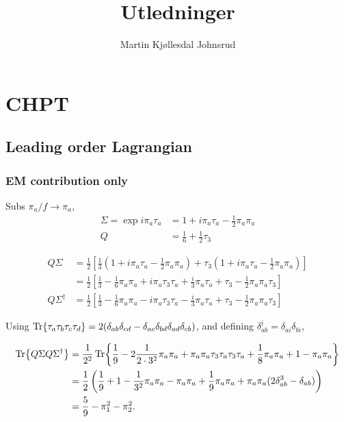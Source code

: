 \documentclass{book}
\title{\huge{Utledninger}}
\author{
    \large{Martin Kjøllesdal Johnsrud }
    }
\begin{document}
\maketitle
\setlength{\parindent}{0em}
\setlength{\parskip}{0.8em}

\chapter{CHPT}
\section{Leading order Lagrangian}

\subsection{EM contribution only}
Subs $\pi_a / f \rightarrow \pi_a$,
\begin{align}
    \Sigma = \exp{i \pi_a \tau_a}
    & = 1 + i\pi_a\tau_a - \frac{1}{2}\pi_a \pi_a \\
    Q 
    & = \frac{1}{6} + \frac{1}{2} \tau_3
\end{align}

\begin{align}
    Q\Sigma 
    & = 
    \frac{1}{2}
    \left[
        \frac{1}{3} 
        \left(
            1 + i\pi_a\tau_a - \frac{1}{2}\pi_a \pi_a
        \right)
        +
        \tau_3
        \left(
            1 + i\pi_a\tau_a - \frac{1}{2}\pi_a \pi_a
        \right)
    \right] \\
    & = 
    \frac{1}{2}
    \left[
        \frac{1}{3} 
        - \frac{1}{6}\pi_a \pi_a
        + i \pi_a \tau_3 \tau_a
        + \frac{i}{3}  \pi_a \tau_a
        + \tau_3
        - \frac{1}{2}\pi_a \pi_a \tau_3 
    \right] \\
    Q \Sigma^\dagger
    & = 
    \frac{1}{2}
    \left[
        \frac{1}{3} 
        - \frac{1}{6}\pi_a \pi_a
        - i \pi_a \tau_3 \tau_a
        - \frac{i}{3}  \pi_a \tau_a
        +\tau_3
        - \frac{1}{2}\pi_a \pi_a \tau_3 
    \right] 
\end{align}


Using $
\Tr{\tau_a \tau_b \tau_c \tau_d} = 2 (\delta_{ab}\delta_{cd}
 - \delta_{ac}\delta_{bd}
 \delta_{ad}\delta_{cb})
$, and defining $\delta_{ab}^i = \delta_{ai}\delta_{bi}$,

\begin{align}
    \Tr{Q \Sigma Q \Sigma^\dagger}
    & =
    \frac{1}{2^2}
    \Tr{
        \frac{1}{9}
        - 2 \frac{1}{2\cdot 3^2} \pi_a \pi_a
        + \pi_a \pi_a \tau_3 \tau_a\tau_3 \tau_a
        + \frac{1}{8} \pi_a \pi_a
        + 1
        - \pi_a\pi_a
    } \\
    & = 
    \frac{1}{2}
    \left(
        \frac{1}{9}
        + 1
        - \frac{1}{3^2} \pi_a \pi_a
        - \pi_a \pi_a
        + \frac{1}{9} \pi_a \pi_a
        + \pi_a \pi_a(2 \delta_{ab}^3 - \delta_{ab})
    \right) \\
    &
    = \frac{5}{9} - \pi_1^2 - \pi_2^2.
\end{align}
\end{document}

